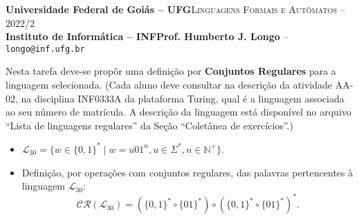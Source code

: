 \documentclass[12pt]{article}
\def\discente{João Lucas Rodrigues Soares}
\def\matricula{202003580}
\def\ua{02}
\def\myling{{30}} %
\def\discente{João Lucas Rodrigues Soares}
\def\matricula{202003580}
\def\ua{02}
\def\myling{{30}} %
\newcommand{\concatL}{\ensuremath{{\scriptstyle\circ}}}%
\begin{document}
 \begin{tcolorbox}[rounded corners, colback=blue!3, colframe=blue!40!black]
  \footnotesize\textbf{Universidade Federal de Goiás -- UFG}\hfill \textsc{Linguagens Formais e Autômatos -- 2022/2}\\
  \footnotesize\textbf{Instituto de Informática -- INF\hfill Prof. Humberto J. Longo} -- \scriptsize\texttt{longo@inf.ufg.br}
 \end{tcolorbox}\bigskip
%
\begin{tcolorbox}[rounded corners, colback=blue!2, colframe=blue!40!black, title=\textbf{Atividade AA-\ua}]
   Nesta tarefa deve-se propôr uma definição por \textbf{Conjuntos Regulares} para a linguagem selecionada. (Cada aluno deve consultar na descrição da atividade AA-\ua, na disciplina INF0333A da plataforma Turing, qual é a linguagem associada ao seu número de matrícula. A descrição da linguagem está disponível no arquivo ``Lista de linguagens regulares'' da Seção ``Coletânea de exercícios''.)
\end{tcolorbox}\bigskip
%
%
\begin{tcolorbox}[rounded corners, colback=yellow!5, colframe=red!40!black, title=\textbf{\matricula\ -- \discente}]
 \begin{itemize}[leftmargin=*]
  \item $\mathcal{L}_\myling = \{w\in\{0,1\}^*\mid w=u01^n, u\in\Sigma^*, n\in\mathbb{N}^+\}$.
%
  \item Definição, por operações com conjuntos regulares, das palavras pertencentes à linguagem $\mathcal{L}_\myling$:
   $$\mathcal{CR}(\mathcal{L}_\myling) =
    (\{0,1\}^*\concatL\{01\}^*)  \concatL  (\{0,1\}^*\concatL\{01\}^*)^*
   .$$
 \end{itemize}
\end{tcolorbox}
%
%
\end{document}
